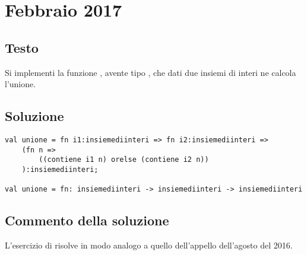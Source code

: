 \section{Febbraio 2017}

\subsection{Testo}

Si implementi la funzione , avente tipo , che dati due insiemi di interi ne calcola l'unione.

\subsection{Soluzione}

\begin{lstlisting}[style = SML, caption = {Definizione della funzione \sml{unione}}]
val unione = fn i1:insiemediinteri => fn i2:insiemediinteri =>
	(fn n =>
		((contiene i1 n) orelse (contiene i2 n))
	):insiemediinteri;

val unione = fn: insiemediinteri -> insiemediinteri -> insiemediinteri
\end{lstlisting}

\subsection{Commento della soluzione}

L'esercizio di risolve in modo analogo a quello dell'appello dell'agosto del 2016.
